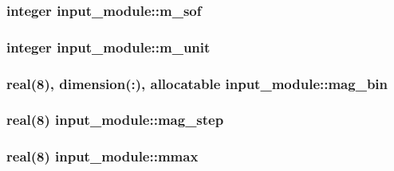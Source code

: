 \subsubsection[{m\+\_\+sof}]{\setlength{\rightskip}{0pt plus 5cm}integer input\+\_\+module\+::m\+\_\+sof}\label{namespaceinput__module_afb3ee34150e00c5c18dddd5db73c0b9f}
\hypertarget{namespaceinput__module_a1a7790113ec65bfe00fa926b09b6a451}{}
\subsubsection[{m\+\_\+unit}]{\setlength{\rightskip}{0pt plus 5cm}integer input\+\_\+module\+::m\+\_\+unit}\label{namespaceinput__module_a1a7790113ec65bfe00fa926b09b6a451}
\hypertarget{namespaceinput__module_a1bbdfb734d8c5f5b6370d1ab7fbfb04a}{}
\subsubsection[{mag\+\_\+bin}]{\setlength{\rightskip}{0pt plus 5cm}real(8), dimension(\+:), allocatable input\+\_\+module\+::mag\+\_\+bin}\label{namespaceinput__module_a1bbdfb734d8c5f5b6370d1ab7fbfb04a}
\hypertarget{namespaceinput__module_a5f4a6ebb1c94126c9810b316e17976e2}{}
\subsubsection[{mag\+\_\+step}]{\setlength{\rightskip}{0pt plus 5cm}real(8) input\+\_\+module\+::mag\+\_\+step}\label{namespaceinput__module_a5f4a6ebb1c94126c9810b316e17976e2}
\hypertarget{namespaceinput__module_a41ea519c5d8ed0def5faaee53d32171e}{}
\subsubsection[{mmax}]{\setlength{\rightskip}{0pt plus 5cm}real(8) input\+\_\+module\+::mmax}\label{namespaceinput__module_a41ea519c5d8ed0def5faaee53d32171e}
\hypertarget{namespaceinput__module_a6f6194544ef970071393414d02104a8f}{}

